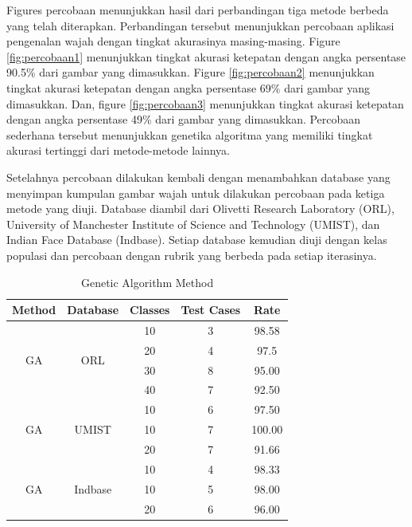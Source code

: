 \documentclass[conference]{IEEEtran}
\begin{document}
Figures percobaan menunjukkan hasil dari perbandingan tiga metode berbeda yang telah diterapkan. Perbandingan tersebut menunjukkan percobaan aplikasi pengenalan wajah dengan tingkat akurasinya masing-masing. Figure \ref{fig:percobaan1} menunjukkan tingkat akurasi ketepatan dengan angka persentase 90.5\% dari gambar yang dimasukkan. Figure \ref{fig:percobaan2} menunjukkan tingkat akurasi ketepatan dengan angka persentase 69\% dari gambar yang dimasukkan. Dan, figure \ref{fig:percobaan3} menunjukkan tingkat akurasi ketepatan dengan angka persentase 49\% dari gambar yang dimasukkan. Percobaan sederhana tersebut menunjukkan genetika algoritma yang memiliki tingkat akurasi tertinggi dari metode-metode lainnya.

Setelahnya percobaan dilakukan kembali dengan menambahkan database yang menyimpan kumpulan gambar wajah untuk dilakukan percobaan pada ketiga metode yang diuji. Database diambil dari Olivetti Research Laboratory (ORL), University of Manchester Institute of Science and Technology (UMIST), dan Indian Face Database (Indbase). Setiap database kemudian diuji dengan kelas populasi dan percobaan dengan rubrik yang berbeda pada setiap iterasinya.

    \begin{table}[htbp!]
    \small %
    \centering
    \setlength{\tabcolsep}{6pt} %
    \renewcommand{\arraystretch}{2.2} %
    \begin{tabular}{|c|c|c|c|c|}
    \hline
    Method & Database & Classes & Test Cases & Rate \\ \hline
    \multirow{4}{*}{GA} & \multirow{4}{*}{ORL} & 10 & 3 & 98.58 \\
    & & 20 & 4 & 97.5 \\
    & & 30 & 8 & 95.00 \\
    & & 40 & 7 & 92.50 \\ \hline
    \multirow{3}{*}{GA} & \multirow{3}{*}{UMIST} & 10 & 6 & 97.50 \\
    & & 10 & 7 & 100.00 \\
    & & 20 & 7 & 91.66 \\ \hline
    \multirow{3}{*}{GA} & \multirow{3}{*}{Indbase} & 10 & 4 & 98.33 \\
    & & 10 & 5 & 98.00 \\
    & & 20 & 6 & 96.00 \\ \hline
    \end{tabular}
    
    \caption{Genetic Algorithm Method}
    \end{table}
    
\end{document}
